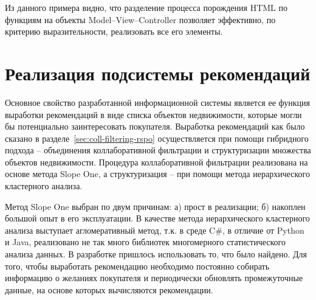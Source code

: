 \documentclass[a4paper,14pt,openany,final]{extreport} %
\begin{document}
{Из данного примера видно, что разделение процесса порождения HTML по функциям на объекты \foreignlanguage{english}{Model--View--Controller} позволяет эффективно, по критерию выразительности, реализовать все его элементы.

\section{Реализация подсистемы рекомендаций}
Основное свойство разработанной информационной системы является ее функция выработки рекомендаций в виде списка объектов недвижимости, которые могли бы потенциально заинтересовать покупателя. Выработка рекомендаций как было сказано в разделе~\ref{sec:coll-filtering-rspo} осуществляется при помощи гибридного подхода -- объединения коллаборативной фильтрации и структуризации множества объектов недвижимости. Процедура коллаборативной фильтрации реализована на основе метода \foreignlanguage{english}{Slope One}, а структуризация -- при помощи метода иерархического кластерного анализа.

Метод Slope One выбран по двум причинам: а) прост в реализации; б) накоплен большой опыт в его эксплуатации. В качестве метода иерархического кластерного анализа выступает агломеративный метод, т.к. в среде C\#, в отличие от Python и Java, реализовано не так много библиотек многомерного статистического анализа данных. В разработке пришлось использовать то, что было найдено. Для того, чтобы выработать рекомендацию необходимо постоянно собирать информацию о желаниях покупателя и периодически обновлять промежуточные данные, на основе которых вычисляются рекомендации.

}
\end{document}
